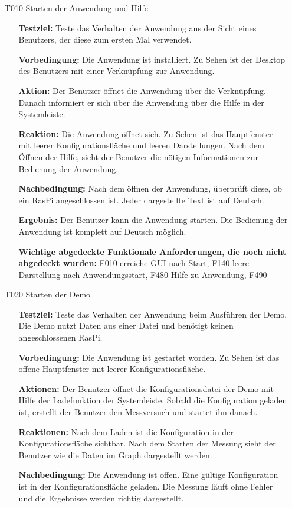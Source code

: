 \documentclass[parskip=full]{scrartcl}
\begin{document}
\begin{itemize} 

\item[T010]Starten der Anwendung und Hilfe
\begin{itemize}

\item []\textbf{Testziel:} Teste das Verhalten der Anwendung aus der Sicht eines Benutzers, der diese zum ersten Mal verwendet.

\item []\textbf{Vorbedingung:} Die Anwendung ist installiert. Zu Sehen ist der Desktop des Benutzers mit einer Verknüpfung zur Anwendung.
\item []\textbf{Aktion:} Der Benutzer öffnet die Anwendung über die Verknüpfung. Danach informiert er sich über die Anwendung über die Hilfe in der Systemleiste.
\item []\textbf{Reaktion:} Die Anwendung öffnet sich. Zu Sehen ist das Hauptfenster mit leerer Konfigurationsfläche und leeren Darstellungen. Nach dem Öffnen der Hilfe, sieht der Benutzer die nötigen Informationen zur Bedienung der Anwendung. 
\item []\textbf{Nachbedingung:} Nach dem öffnen der Anwendung, überprüft diese, ob ein \gls{RasPi} angeschlossen ist. Jeder dargestellte Text ist auf Deutsch.

\item []\textbf{Ergebnis:} Der Benutzer kann die Anwendung starten. Die Bedienung der Anwendung ist komplett auf Deutsch möglich.
\item []\textbf{Wichtige abgedeckte Funktionale Anforderungen, die noch nicht abgedeckt wurden:} F010 erreiche GUI nach Start, F140 leere Darstellung nach Anwendungsstart, F480 Hilfe zu Anwendung, F490

\end{itemize}


\item[T020] Starten der Demo 
\begin{itemize}

\item []\textbf{Testziel:} Teste das Verhalten der Anwendung beim Ausführen der Demo. Die Demo nutzt Daten aus einer Datei und benötigt keinen angeschlossenen \gls{RasPi}.

\item []\textbf{Vorbedingung:} Die Anwendung ist gestartet worden. Zu Sehen ist das offene Hauptfenster mit leerer Konfigurationsfläche.
\item []\textbf{Aktionen:} Der Benutzer öffnet die Konfigurationsdatei der Demo mit Hilfe der Ladefunktion der Systemleiste. Sobald die Konfiguration geladen ist, erstellt der Benutzer den Messversuch und startet ihn danach.
\item []\textbf{Reaktionen:} Nach dem Laden ist die Konfiguration in der Konfigurationsfläche sichtbar. Nach dem Starten der Messung sieht der Benutzer wie die Daten im Graph dargestellt werden.
\item []\textbf{Nachbedingung:} Die Anwendung ist offen. Eine gültige Konfiguration ist in der Konfigurationsfläche geladen. Die Messung läuft ohne Fehler und die Ergebnisse werden richtig dargestellt.


\end{itemize}
\end{itemize}
\end{document}
